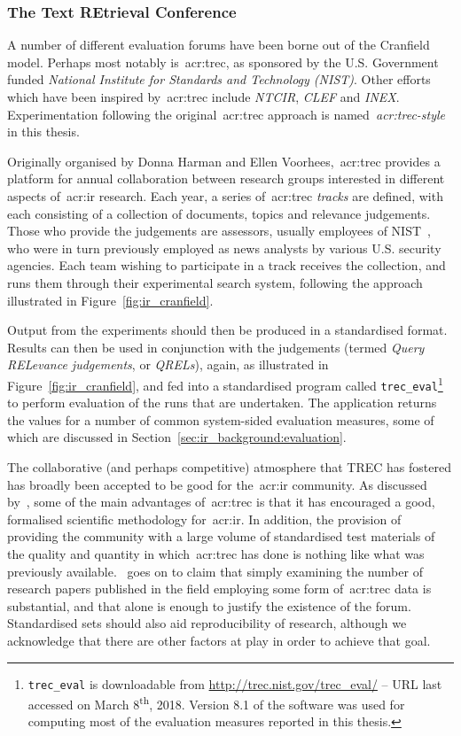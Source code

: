 \subsubsection{The Text REtrieval Conference}\label{sec:ir_background:basics:cranfield:trec}
A number of different evaluation forums have been borne out of the Cranfield model. Perhaps most notably is~\gls{acr:trec}, as sponsored by the U.S. Government funded \emph{National Institute for Standards and Technology (NIST)}. Other efforts which have been inspired by~\gls{acr:trec} include \emph{NTCIR}, \emph{CLEF} and \emph{INEX}. Experimentation following the original~\gls{acr:trec} approach is named\emph{~\gls{acr:trec}-style} in this thesis.

Originally organised by Donna Harman and Ellen Voorhees,~\gls{acr:trec} provides a platform for annual collaboration between research groups interested in different aspects of~\gls{acr:ir} research. Each year, a series of~\gls{acr:trec} \emph{tracks} are defined, with each consisting of a collection of documents, topics and relevance judgements. Those who provide the judgements are assessors, usually employees of NIST~\citep{robertson2008history_ir_evaluation}, who were in turn previously employed as news analysts by various U.S. security agencies. Each team wishing to participate in a track receives the collection, and runs them through their experimental search system, following the approach illustrated in Figure~\ref{fig:ir_cranfield}.

Output from the experiments should then be produced in a standardised format. Results can then be used in conjunction with the judgements (termed \emph{Query RELevance judgements}, or \emph{QRELs}), again, as illustrated in Figure~\ref{fig:ir_cranfield}, and fed into a standardised program called \texttt{trec\_eval}\footnote{\texttt{trec\_eval} is downloadable from \url{http://trec.nist.gov/trec_eval/} -- URL last accessed on March 8\textsuperscript{th}, 2018. Version 8.1 of the software was used for computing most of the evaluation measures reported in this thesis.} to perform evaluation of the runs that are undertaken. The application returns the values for a number of common system-sided evaluation measures, some of which are discussed in Section~\ref{sec:ir_background:evaluation}. 

The collaborative (and perhaps competitive) atmosphere that TREC has fostered has broadly been accepted to be good for the~\gls{acr:ir} community. As discussed by~\cite{robertson2008history_ir_evaluation}, some of the main advantages of~\gls{acr:trec} is that it has encouraged a good, formalised scientific methodology for~\gls{acr:ir}. In addition, the provision of providing the community with a large volume of standardised test materials of the quality and quantity in which~\gls{acr:trec} has done is nothing like what was previously available.~\cite{robertson2008history_ir_evaluation} goes on to claim that simply examining the number of research papers published in the field employing some form of~\gls{acr:trec} data is substantial, and that alone is enough to justify the existence of the forum. Standardised sets should also aid reproducibility of research, although we acknowledge that there are other factors at play in order to achieve that goal. 


